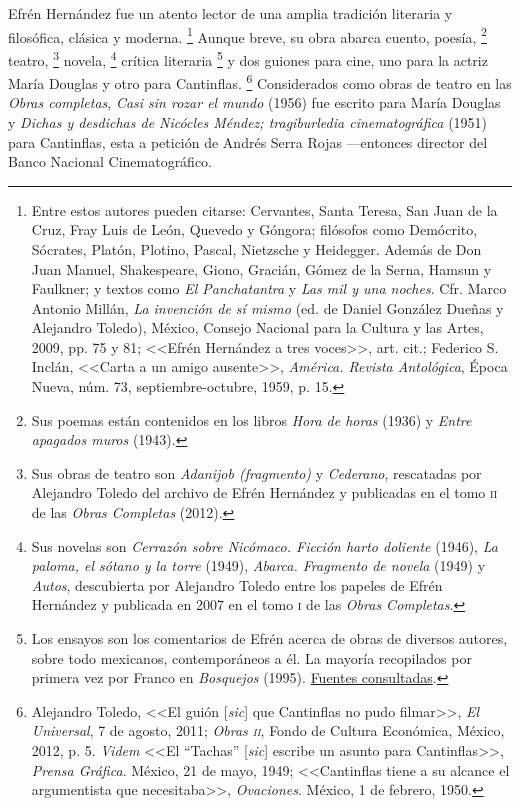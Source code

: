 \documentclass[14pt,twoside,final]{extbook} %
\let\oldfootnote\footnote
\renewcommand\footnote[1]{%
\oldfootnote{\hspace{1mm}#1}}
\begin{document}
Efrén Hernández fue un atento lector de una amplia tradición literaria y filosófica, clásica y moderna.\footnote{Entre estos autores pueden citarse: Cervantes, Santa Teresa, San Juan de la Cruz, Fray Luis de León, Quevedo y Góngora; filósofos como Demócrito, Sócrates, Platón, Plotino, Pascal, Nietzsche y Heidegger. Además de Don Juan Manuel, Shakespeare, Giono, Gracián, Gómez de la Serna, Hamsun y Faulkner; y textos como \emph{El Panchatantra} y \emph{Las mil y una noches}. Cfr. Marco Antonio Millán, \emph{La invención de sí mismo} (ed. de Daniel González Dueñas y Alejandro Toledo), México, Consejo Nacional para la Cultura y las Artes, 2009, pp. 75 y 81; <<Efrén Hernández a tres voces>>, art. cit.; Federico S.\,Inclán, <<Carta a un amigo ausente>>, \emph{América. Revista Antológica}, Época Nueva, núm. 73, septiembre-octubre, 1959, p. 15.} Aunque breve, su obra abarca cuento, poesía,\footnote{Sus poemas están contenidos en los libros \emph{Hora de horas} (1936) y \emph{Entre apagados muros} (1943).} teatro,\footnote{Sus obras de teatro son \emph{Adanijob (fragmento)} y \emph{Cederano}, rescatadas por Alejandro Toledo del archivo de Efrén Hernández y publicadas en el tomo \textsc{ii} de las \emph{Obras Completas} (2012).} novela,\footnote{Sus novelas son \emph{Cerrazón sobre Nicómaco. Ficción harto doliente} (1946), \emph{La paloma, el sótano y la torre} (1949), \emph{Abarca. Fragmento de novela} (1949) y \emph{Autos}, descubierta por Alejandro Toledo entre los papeles de Efrén Hernández y publicada en 2007 en el tomo \textsc{i} de las \emph{Obras Completas}.} crítica literaria\footnote{Los ensayos son los comentarios de Efrén acerca de obras de diversos autores, sobre todo mexicanos, contemporáneos a él. La mayoría recopilados por primera vez por Franco en \emph{Bosquejos} (1995). \ding{43} \hyperref[bib:franco1995]{Fuentes consultadas}.} y dos guiones para cine, uno para la actriz María Douglas y otro para Cantinflas.\footnote{Alejandro Toledo, <<El guión [\emph{sic}] que Cantinflas no pudo filmar>>, \emph{El Universal}, 7 de agosto, 2011; \emph{Obras \textsc{ii}}, Fondo de Cultura Económica, México, 2012, p. 5. \emph{Videm} <<El ``Tachas'' [\emph{sic}] escribe un asunto para Cantinflas>>, \emph{Prensa Gráfica}. México, 21 de mayo, 1949; <<Cantinflas tiene a su alcance el argumentista que necesitaba>>,  \emph{Ovaciones}. México, 1 de febrero, 1950.} Considerados como obras de teatro en las \emph{Obras completas}, \emph{Casi sin rozar el mundo} (1956) fue escrito para María Douglas y \emph{Dichas y desdichas de Nicócles Méndez; tragiburledia cinematográfica} (1951) para Cantinflas, esta a petición de Andrés Serra Rojas ---entonces director del Banco Nacional Cinematográfico.
\end{document}
